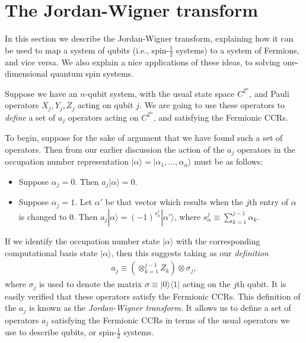 \documentclass[12pt]{article}
\begin{document}
\section{The Jordan-Wigner transform}

In this section we describe the Jordan-Wigner transform, explaining how
it can be used to map a system of qubits (i.e., spin-$\frac 12$
systems) to a system of Fermions, and vice versa.  We also explain a
nice applications of these ideas, to solving one-dimensional quantum
spin systems.

Suppose we have an $n$-qubit system, with the usual state space
$C^{2^n}$, and Pauli operators $X_j, Y_j,Z_j$ acting on qubit $j$.  We
are going to use these operators to \emph{define} a set of $a_j$
operators acting on $C^{2^n}$, and satisfying the Fermionic CCRs.

To begin, suppose for the sake of argument that we have found such a
set of operators.  Then from our earlier discussion the action of the
$a_j$ operators in the occupation number representation
$|\alpha\rangle = |\alpha_1,\ldots,\alpha_n\rangle$ must be as
follows:
\begin{itemize}
\item Suppose $\alpha_j = 0$.  Then $a_j|\alpha\rangle = 0$.
  
\item Suppose $\alpha_j = 1$.  Let $\alpha'$ be that vector which
  results when the $j$th entry of $\alpha$ is changed to $0$.  Then
  $a_j|\alpha\rangle = (-1)^{s_\alpha^j} |\alpha'\rangle$, where
  $s_\alpha^j \equiv \sum_{k=1}^{j-1} \alpha_k$.
\end{itemize}
If we identify the occupation number state $|\alpha\rangle$ with the
corresponding computational basis state $|\alpha\rangle$, then this
suggests taking as our \emph{definition}
\begin{eqnarray}
  a_j \equiv \left( \otimes_{k=1}^{j-1} Z_k \right) \otimes \sigma_j,
\end{eqnarray}
where $\sigma_j$ is used to denote the matrix $\sigma \equiv |0\rangle
\langle 1|$ acting on the $j$th qubit.  It is easily verified that
these operators satisfy the Fermionic CCRs.  This definition of the
$a_j$ is known as the \emph{Jordan-Wigner transform}.  It allows us to
define a set of operators $a_j$ satisfying the Fermionic CCRs in terms
of the usual operators we use to describe qubits, or spin-$\frac 12$
systems.
\end{document}

